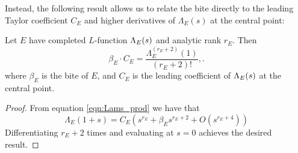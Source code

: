 Instead, the following result allows us to relate the bite directly to the leading Taylor coefficient $C_E$ and higher derivatives of $\Lambda_E(s)$ at the central point:
\begin{proposition}[GRH]\label{prop:bite_times_leading_coeff}
Let $E$ have completed $L$-function $\Lambda_E(s)$ and analytic rank $r_E$. Then
\begin{equation}
\beta_E\cdot C_E = \frac{\Lambda_E^{(r_E+2)}(1)}{(r_E+2)!},.
\end{equation}
where $\beta_E$ is the bite of $E$, and $C_E$ is the leading coefficient of $\Lambda_E(s)$ at the central point.
\end{proposition}
\begin{proof}
From equation \ref{eqn:Lams_prod} we have that 
\begin{equation}
\Lambda_E(1+s) = C_E\left(s^{r_E} + \beta_E s^{r_E+2} + O(s^{r_E+4})\right)
\end{equation}
Differentiating $r_E+2$ times and evaluating at $s=0$ achieves the desired result.
\end{proof}

